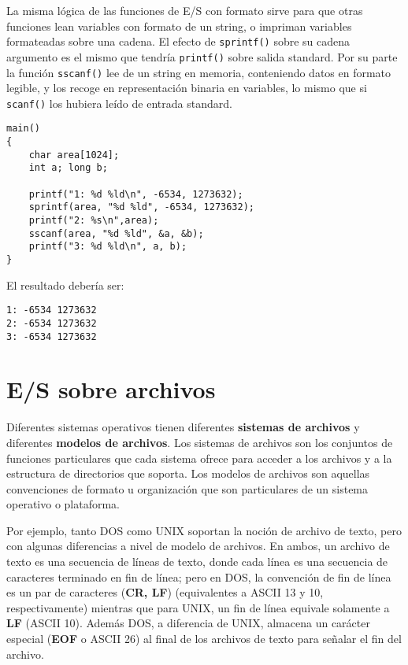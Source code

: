 La misma lógica de las funciones de E/S con formato sirve para que otras
funciones lean variables con formato de un string, o impriman variables
formateadas sobre una cadena. El efecto de \lstinline{sprintf()} sobre su cadena argumento
es el mismo que tendría \lstinline{printf()} sobre salida standard. Por su parte la función 
\lstinline{sscanf()} lee de un string en memoria, conteniendo datos en formato legible, y los
recoge en representación binaria en variables, lo mismo que si \lstinline{scanf()} los
hubiera leído de entrada standard.

\begin{ejemplo}
\begin{lstlisting}
main()
{
    char area[1024];
    int a; long b;
    
	printf("1: %d %ld\n", -6534, 1273632);
    sprintf(area, "%d %ld", -6534, 1273632);
	printf("2: %s\n",area);
    sscanf(area, "%d %ld", &a, &b);
    printf("3: %d %ld\n", a, b);
}
\end{lstlisting}

El resultado debería ser:
\begin{lstlisting}
1: -6534 1273632
2: -6534 1273632
3: -6534 1273632
\end{lstlisting}
\end{ejemplo}

\chapter{E/S sobre archivos}
\label{sec:esarchivos}

Diferentes sistemas operativos tienen diferentes \textbf{sistemas de archivos} y
diferentes \textbf{modelos de archivos}. Los sistemas de archivos son los conjuntos de
funciones particulares que cada sistema ofrece para acceder a los archivos y a
la estructura de directorios que soporta. Los modelos de archivos son aquellas
convenciones de formato u organización que son particulares de un sistema
operativo o plataforma.

Por ejemplo, tanto DOS como UNIX soportan la noción de archivo de texto, pero
con algunas diferencias a nivel de modelo de archivos. En ambos, un archivo de
texto es una secuencia de líneas de texto, donde cada línea es una secuencia de
caracteres terminado en fin de línea; pero en DOS, la convención de fin de
línea es un par de caracteres (\textbf{CR, LF}) (equivalentes a ASCII 13 y 10, respectivamente) mientras
que para UNIX, un fin de línea equivale solamente a \textbf{LF} (ASCII 10). Además DOS, a diferencia de UNIX,
almacena un carácter especial (\textbf{EOF} o ASCII 26) al final de los archivos 
de texto para señalar el fin del archivo.


